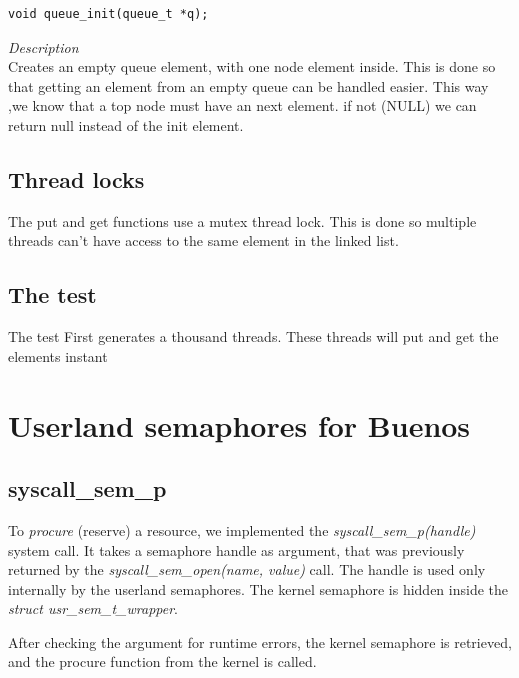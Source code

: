 \documentclass[11pt]{article}
\begin{document}
\begin{lstlisting}[style=customc]
void queue_init(queue_t *q);
\end{lstlisting}
\textit{Description} \\
Creates an empty queue element, with one node element inside. This is done so that getting an element from an empty queue can be handled easier. This way ,we know that a top node must have an next element. if not (NULL) we can return null instead of the init element.

\subsection{Thread locks}
The put and get functions use a mutex thread lock. This is done so multiple threads can't have access to the same element in the linked list.
\subsection{The test}
The test First generates a thousand threads. These threads will put and get the elements instant 

\section{Userland semaphores for Buenos}
\subsection{syscall\_sem\_p}
To \emph{procure} (reserve) a resource, we implemented the \emph{syscall\_sem\_p(handle)} system call. It takes a semaphore handle as argument, that was previously returned by the \emph{syscall\_sem\_open(name, value)} call. The handle is used only internally by the userland semaphores. The kernel semaphore is hidden inside the \emph{struct usr\_sem\_t\_wrapper}.

After checking the argument for runtime errors, the kernel semaphore is retrieved, and the procure function from the kernel is called.




\end{document}
